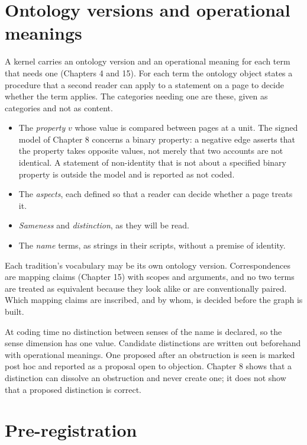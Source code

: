 \documentclass[11pt]{article}
\begin{document}
\section{Ontology versions and operational meanings}\label{sec:ontology}

A kernel carries an ontology version and an operational meaning for each term that needs one (Chapters 4 and 15). For each term the ontology object states a procedure that a second reader can apply to a statement on a page to decide whether the term applies. The categories needing one are these, given as categories and not as content.

\begin{itemize}[nosep]
\item The \emph{property} $v$ whose value is compared between pages at a unit. The signed model of Chapter 8 concerns a binary property: a negative edge asserts that the property takes opposite values, not merely that two accounts are not identical. A statement of non-identity that is not about a specified binary property is outside the model and is reported as not coded.
\item The \emph{aspects}, each defined so that a reader can decide whether a page treats it.
\item \emph{Sameness} and \emph{distinction}, as they will be read.
\item The \emph{name} terms, as strings in their scripts, without a premise of identity.
\end{itemize}

Each tradition's vocabulary may be its own ontology version. Correspondences are mapping claims (Chapter 15) with scopes and arguments, and no two terms are treated as equivalent because they look alike or are conventionally paired. Which mapping claims are inscribed, and by whom, is decided before the graph is built.

At coding time no distinction between senses of the name is declared, so the sense dimension has one value. Candidate distinctions are written out beforehand with operational meanings. One proposed after an obstruction is seen is marked post hoc and reported as a proposal open to objection. Chapter 8 shows that a distinction can dissolve an obstruction and never create one; it does not show that a proposed distinction is correct.

\section{Pre-registration}\label{sec:prereg}
\end{document}
